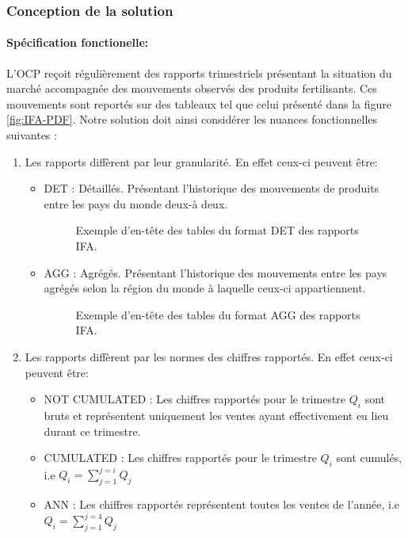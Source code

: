 	\subsubsection{Conception de la solution}
	\paragraph{Spécification fonctionelle:\\}
	L'OCP reçoit régulièrement des rapports trimestriels présentant la situation du marché accompagnée des mouvements observés des produits fertilisants. Ces mouvements sont reportés sur des tableaux tel que celui présenté dans la figure \ref{fig:IFA-PDF}. Notre solution doit ainsi considérer les nuances fonctionnelles suivantes :
	\begin{enumerate}
	\item Les rapports diffèrent par leur granularité. En effet ceux-ci peuvent être:
		\begin{itemize}
		\item DET : Détaillés. Présentant l'historique des mouvements de produits entre les pays du monde deux-à deux.
		\begin{figure}[h]
					    		\centering
					    		\caption{Exemple d'en-tête des tables du format DET des rapports IFA.}
					    		\label{fig:CART}
				\end{figure}
		\item AGG : Agrégés. Présentant l'historique des mouvements entre les pays agrégés selon la région du monde à laquelle ceux-ci appartiennent.
		\begin{figure}[h]
			    		\centering
			    		\caption{Exemple d'en-tête des tables du format  AGG des rapports IFA.}
			    		\label{fig:CART}
		\end{figure}
		\end{itemize}
	\item Les rapports diffèrent par les normes des chiffres rapportés. En effet ceux-ci peuvent être:
		\begin{itemize}
		\item NOT CUMULATED : Les chiffres rapportés pour le trimestre ${Q_i}$ sont bruts et représentent uniquement les ventes ayant effectivement eu lieu durant ce trimestre.
		\item CUMULATED : Les chiffres rapportés pour le trimestre ${Q_i}$ sont cumulés, i.e ${Q_i = \sum_{j=1}^{j=i} Q_j}$
		\item ANN : Les chiffres rapportés représentent toutes les ventes de l'année, i.e ${Q_i = \sum_{j=1}^{j=4} Q_j}$
		\end{itemize}
	\end{enumerate}
